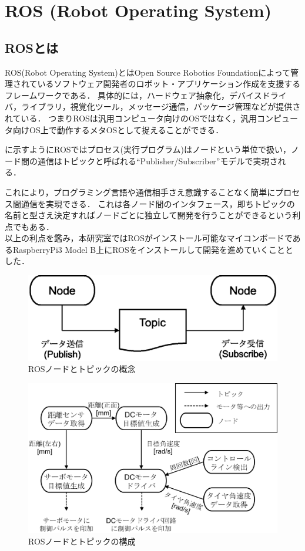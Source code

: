 \documentclass[11pt,a4j]{jarticle}
\begin{document}
\section{ROS (Robot Operating System)}
\subsection{ROSとは}
ROS(Robot Operating System)とはOpen Source Robotics Foundationによって管理されているソフトウェア開発者のロボット・アプリケーション作成を支援するフレームワークである．
具体的には，ハードウェア抽象化，デバイスドライバ，ライブラリ，視覚化ツール，メッセージ通信，パッケージ管理などが提供されている．
つまりROSは汎用コンピュータ向けのOSではなく，汎用コンピュータ向けOS上で動作するメタOSとして捉えることができる\cite{kurazume}．

に示すようにROSではプロセス(実行プログラム)はノードという単位で扱い，ノード間の通信はトピックと呼ばれる``Publisher/Subscriber''モデルで実現される\cite{ogura}．

これにより，プログラミング言語や通信相手さえ意識することなく簡単にプロセス間通信を実現できる．
これは各ノード間のインタフェース，即ちトピックの名前と型さえ決定すればノードごとに独立して開発を行うことができるという利点でもある．\\

以上の利点を鑑み，本研究室ではROSがインストール可能なマイコンボードであるRaspberryPi3 Model B上にROSをインストールして開発を進めていくこととした．

\begin{figure}[htb]
  \centering
    \includegraphics[width=0.5\hsize]{picture/eps/ros_topic.eps}
    \caption{ROSノードとトピックの概念}
    \label{fig::ros_topic}
\end{figure}



\begin{figure}[htb]
  \centering
    \includegraphics[width=0.8\hsize]{picture/eps/ros_nodes.eps}
    \caption{ROSノードとトピックの構成}
    \label{fig::ros_nodes}
\end{figure}
\end{document}
